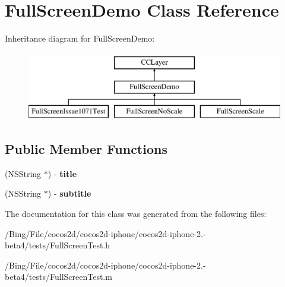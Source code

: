 \hypertarget{interface_full_screen_demo}{\section{Full\-Screen\-Demo Class Reference}
\label{interface_full_screen_demo}
}
Inheritance diagram for Full\-Screen\-Demo\-:\begin{figure}[H]
\begin{center}
\leavevmode
\includegraphics[height=3.000000cm]{interface_full_screen_demo}
\end{center}
\end{figure}
\subsection*{Public Member Functions}
\begin{DoxyCompactItemize}
\item 
\hypertarget{interface_full_screen_demo_ad09a8b11c41bf0bd1b9dbd14965b1a95}{(N\-S\-String $\ast$) -\/ {\bfseries title}}\label{interface_full_screen_demo_ad09a8b11c41bf0bd1b9dbd14965b1a95}

\item 
\hypertarget{interface_full_screen_demo_a6162a77fdeeaabd4d83dcadc834d296a}{(N\-S\-String $\ast$) -\/ {\bfseries subtitle}}\label{interface_full_screen_demo_a6162a77fdeeaabd4d83dcadc834d296a}

\end{DoxyCompactItemize}


The documentation for this class was generated from the following files\-:\begin{DoxyCompactItemize}
\item 
/\-Bing/\-File/cocos2d/cocos2d-\/iphone/cocos2d-\/iphone-\/2.-\/beta4/tests/Full\-Screen\-Test.\-h\item 
/\-Bing/\-File/cocos2d/cocos2d-\/iphone/cocos2d-\/iphone-\/2.-\/beta4/tests/Full\-Screen\-Test.\-m\end{DoxyCompactItemize}

